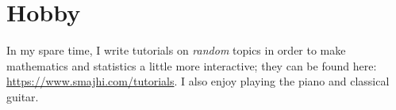 \documentclass[11pt]{article}
\newif\iflong
\begin{document}
\iflong

\fi

\section{Hobby}
In my spare time, I write tutorials on \emph{random} topics in order to make
mathematics and statistics a little more interactive; they can be found here:
\url{https://www.smajhi.com/tutorials}. I also enjoy playing the piano and
classical guitar.

%
\end{document}
